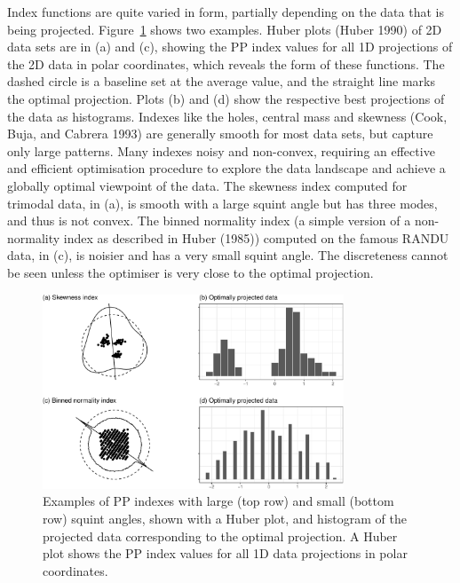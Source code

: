 \documentclass[
  12pt,
]{interact}
\theoremstyle{plain}
\begin{document}
Index functions are quite varied in form, partially depending on the
data that is being projected. Figure~\ref{fig-example-functions} shows
two examples. Huber plots (Huber 1990) of 2D data sets are in (a) and
(c), showing the PP index values for all 1D projections of the 2D data
in polar coordinates, which reveals the form of these functions. The
dashed circle is a baseline set at the average value, and the straight
line marks the optimal projection. Plots (b) and (d) show the respective
best projections of the data as histograms. Indexes like the holes,
central mass and skewness (Cook, Buja, and Cabrera 1993) are generally
smooth for most data sets, but capture only large patterns. Many indexes
noisy and non-convex, requiring an effective and efficient optimisation
procedure to explore the data landscape and achieve a globally optimal
viewpoint of the data. The skewness index computed for trimodal data, in
(a), is smooth with a large squint angle but has three modes, and thus
is not convex. The binned normality index (a simple version of a
non-normality index as described in Huber (1985)) computed on the famous
RANDU data, in (c), is noisier and has a very small squint angle. The
discreteness cannot be seen unless the optimiser is very close to the
optimal projection.

\begin{figure}

{\centering \includegraphics[width=0.8\textwidth,height=\textheight]{jso_files/figure-pdf/fig-example-functions-1.pdf}

}

\caption{\label{fig-example-functions}Examples of PP indexes with large
(top row) and small (bottom row) squint angles, shown with a Huber plot,
and histogram of the projected data corresponding to the optimal
projection. A Huber plot shows the PP index values for all 1D data
projections in polar coordinates.}

\end{figure}
\end{document}
